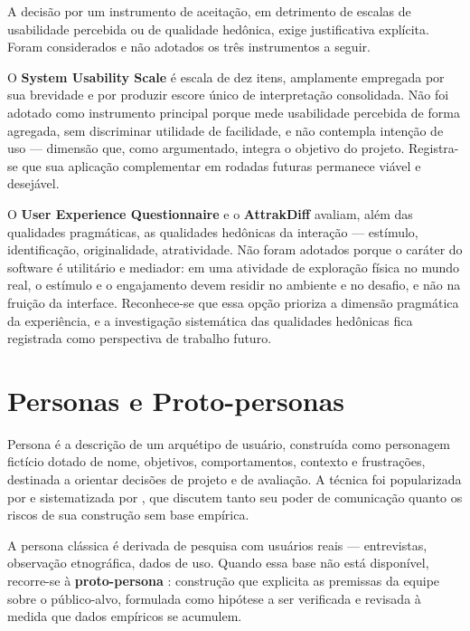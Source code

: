A decisão por um instrumento de aceitação, em detrimento de escalas de usabilidade
percebida ou de qualidade hedônica, exige justificativa explícita. Foram
considerados e não adotados os três instrumentos a seguir.

O \textbf{System Usability Scale} \cite{brooke1996} é escala de dez itens,
amplamente empregada por sua brevidade e por produzir escore único de
interpretação consolidada. Não foi adotado como instrumento principal porque mede
usabilidade percebida de forma agregada, sem discriminar utilidade de facilidade,
e não contempla intenção de uso --- dimensão que, como argumentado, integra o
objetivo do projeto. Registra-se que sua aplicação complementar em rodadas
futuras permanece viável e desejável.

O \textbf{User Experience Questionnaire} \cite{laugwitz2008} e o
\textbf{AttrakDiff} \cite{hassenzahl2003} avaliam, além das qualidades
pragmáticas, as qualidades hedônicas da interação --- estímulo, identificação,
originalidade, atratividade. Não foram adotados porque o caráter do software é
utilitário e mediador: em uma atividade de exploração física no mundo real, o
estímulo e o engajamento devem residir no ambiente e no desafio, e não na fruição
da interface. Reconhece-se que essa opção prioriza a dimensão pragmática da
experiência, e a investigação sistemática das qualidades hedônicas fica
registrada como perspectiva de trabalho futuro.

\section{Personas e Proto-personas}
\label{sec:personas_teoria}

Persona é a descrição de um arquétipo de usuário, construída como personagem
fictício dotado de nome, objetivos, comportamentos, contexto e frustrações,
destinada a orientar decisões de projeto e de avaliação. A técnica foi
popularizada por  e sistematizada por
, que discutem tanto seu poder de comunicação quanto
os riscos de sua construção sem base empírica.

A persona clássica é derivada de pesquisa com usuários reais --- entrevistas,
observação etnográfica, dados de uso. Quando essa base não está disponível,
recorre-se à \textbf{proto-persona} \cite{gothelf2013}: construção que explicita
as premissas da equipe sobre o público-alvo, formulada como hipótese a ser
verificada e revisada à medida que dados empíricos se acumulem.

